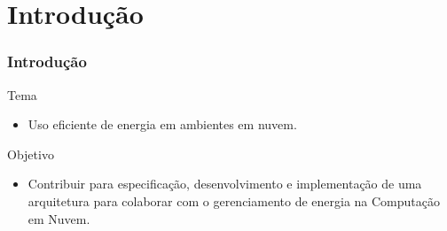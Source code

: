 \section{Introdução}
% 



\frame
{
\frametitle{Introdução}

\begin{block}{Tema}
	\begin{itemize}
		\item Uso eficiente de energia em ambientes em nuvem.
	\end{itemize}
	\vspace{2mm}
\end{block}

\begin{block}{Objetivo}
\begin{itemize}
	\item  Contribuir para especificação, desenvolvimento e implementação de uma arquitetura para colaborar com o gerenciamento de energia na Computação em Nuvem.\vspace{2mm}
\end{itemize}

\end{block}
}

